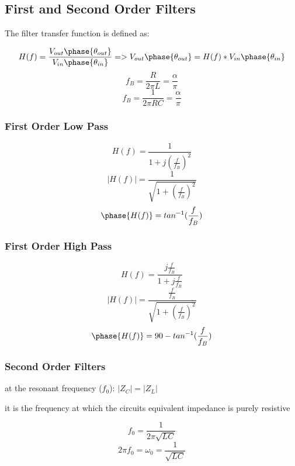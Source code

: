 \documentclass{article}
\begin{document}
\subsection*{First and Second Order Filters}
\begin{center}
    The filter transfer function is defined as:
\end{center}
\begin{equation}
    H(f) = \frac{V_{out}\phase{\theta_{out}}}{V_{in}\phase{\theta_{in}}} => V_{out}\phase{\theta_{out}} = H(f)*V_{in}\phase{\theta_{in}}
\end{equation}
\begin{equation}
    f_B =  \frac{R}{2\pi L} = \frac{\alpha}{\pi}
\end{equation}
\begin{equation}
    f_B =  \frac{1}{2\pi RC} = \frac{\alpha}{\pi}
\end{equation}
\subsubsection*{First Order Low Pass}
\begin{equation}
    H(f) =  \frac{1}{1+j(\frac{f}{f_B})^2}
\end{equation}
\begin{equation}
    |H(f)| =  \frac{1}{\sqrt{1+(\frac{f}{f_B})^2}}
\end{equation}
\begin{equation}
    \phase{H(f)} =  tan^{-1}(\frac{f}{f_B})
\end{equation}
\subsubsection*{First Order High Pass}
\begin{equation}
    H(f) =  \frac{j\frac{f}{f_B}}{1+j\frac{f}{f_B}}
\end{equation}
\begin{equation}
    |H(f)| =  \frac{\frac{f}{f_B}}{\sqrt{1+(\frac{f}{f_B})^2}}
\end{equation}
\begin{equation}
    \phase{H(f)} =  90 - tan^{-1}(\frac{f}{f_B})
\end{equation}
\subsubsection*{Second Order Filters}
\begin{center}
    at the resonant frequency ($f_0$): $|Z_{C  }|=|Z_{L}|$
    
    it is the frequency at which the circuits equivalent impedance is purely resistive
\end{center}
\begin{equation}
    f_0 = \frac{1}{2\pi\sqrt{LC}}
\end{equation}
\begin{equation}
    2\pi f_0 =  \omega_0 = \frac{1}{\sqrt{LC}}
\end{equation}
\end{document}
